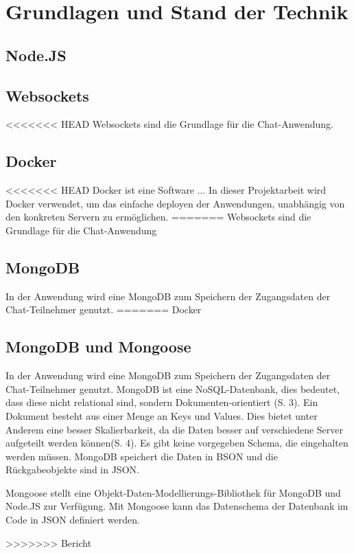 
\chapter{Grundlagen und Stand der Technik}\label{cha:Grundlagen}
\section{Node.JS}\label{sec:Node.JS}

\section{Websockets}\label{sec:Websockets}
<<<<<<< HEAD
Websockets sind die Grundlage für die Chat-Anwendung.
\section{Docker}\label{sec:Docker}
<<<<<<< HEAD
Docker ist eine Software ... In dieser Projektarbeit wird Docker verwendet, um das einfache deployen der Anwendungen, unabhängig von den konkreten Servern zu ermöglichen.
=======
Websockets sind die Grundlage für die Chat-Anwendung

\section{MongoDB}\label{sec:MongoDB}
In der Anwendung wird eine MongoDB zum Speichern der Zugangsdaten der Chat-Teilnehmer genutzt.
=======
Docker 
\section{MongoDB und Mongoose}\label{sec:MongoDB}
In der Anwendung wird eine MongoDB zum Speichern der Zugangsdaten der Chat-Teilnehmer genutzt.
MongoDB ist eine NoSQL-Datenbank, dies bedeutet, dass diese nicht relational sind, sondern Dokumenten-orientiert (S. 3). Ein Dokument besteht aus einer Menge an Keys und Values.
Dies bietet unter Anderem eine besser Skalierbarkeit, da die Daten besser auf verschiedene Server aufgeteilt werden können(S. 4). Es gibt keine vorgegeben Schema, die eingehalten werden müssen. MongoDB speichert die Daten in BSON und die Rückgabeobjekte sind in JSON.


Mongoose stellt eine Objekt-Daten-Modellierungs-Bibliothek für MongoDB und Node.JS zur Verfügung.
Mit Mongoose kann das Datenschema der Datenbank im Code in JSON definiert werden.

>>>>>>> Bericht
